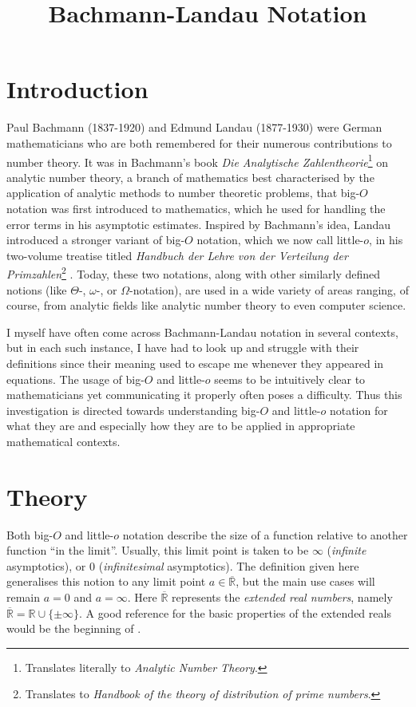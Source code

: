 \documentclass{article}
\title{Bachmann-Landau Notation}
\date{}
\theoremstyle{definition}
\newcommand\RR{\mathbb R}
\newcommand\RRE{\overline{\mathbb R}}
\begin{document}
\maketitle

\section{Introduction}\label{sec:introduction}

Paul Bachmann (1837-1920) and Edmund Landau (1877-1930) were German mathematicians who are both remembered for their numerous contributions to number theory.
It was in Bachmann's book \textit{Die Analytische Zahlentheorie}\footnote{Translates literally to \textit{Analytic Number Theory}.} \cite{Bachmann1894} on analytic number theory, a branch of mathematics best characterised by the application of analytic methods to number theoretic problems, that big-$O$ notation was first introduced to mathematics, which he used for handling the error terms in his asymptotic estimates.
Inspired by Bachmann's idea, Landau introduced a stronger variant of big-$O$ notation, which we now call little-$o$, in his two-volume treatise titled \textit{Handbuch der Lehre von der Verteilung der Primzahlen}\footnote{Translates to \textit{Handbook of the theory of distribution of prime numbers}.} \cite{Landau1909}.
Today, these two notations, along with other similarly defined notions (like \(\Theta\)-, \(\omega\)-, or \(\Omega\)-notation), are used in a wide variety of areas ranging, of course, from analytic fields like analytic number theory to even computer science.

I myself have often come across Bachmann-Landau notation in several contexts, but in each such instance, I have had to look up and struggle with their definitions since their meaning used to escape me whenever they appeared in equations.
The usage of big-$O$ and little-$o$ seems to be intuitively clear to mathematicians yet communicating it properly often poses a difficulty.
Thus this investigation is directed towards understanding big-$O$ and little-$o$ notation for what they are and especially how they are to be applied in appropriate mathematical contexts.

\section{Theory}\label{sec:theory}

Both big-$O$ and little-$o$ notation describe the size of a function relative to another function ``in the limit''.
Usually, this limit point is taken to be \(\infty\) (\textit{infinite} asymptotics), or \(0\) (\textit{infinitesimal} asymptotics).
The definition given here generalises this notion to any limit point \(a\in\RRE\), but the main use cases will remain \(a=0\) and \(a=\infty\).
Here \(\RRE\) represents the \textit{extended real numbers}, namely \(\RRE = \RR \cup \{\pm\infty\}\).
A good reference for the basic properties of the extended reals would be the beginning of \cite{Rudin1953}.
\end{document}
